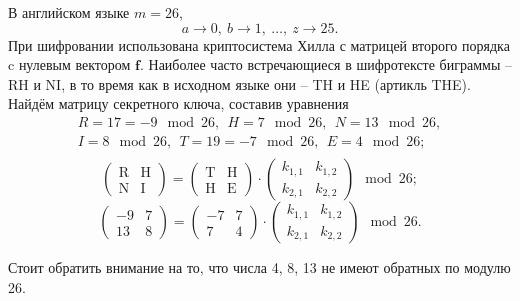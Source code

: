 \example В английском языке $m = 26$,
    \[ a \rightarrow 0, ~ b \rightarrow 1, ~ \dots, ~ z \rightarrow 25. \]
При шифровании использована криптосистема Хилла с матрицей второго порядка c нулевым вектором $\mathbf{f}$. Наиболее часто встречающиеся в шифротексте биграммы -- RH и NI, в то время как в исходном языке они -- TH и HE (артикль THE). Найдём матрицу секретного ключа, составив уравнения
\[
    \begin{array}{l}
        R = 17 = -9 \mod 26, ~~ H = 7 \mod 26, ~~ N = 13 \mod 26, \\
        I = 8 \mod 26, ~~ T = 19 = -7 \mod 26, ~~ E=4 \mod 26; \\
    \end{array}
\] \[
    \left( \begin{array}{cc}
        \text{R} & \text{H} \\
        \text{N} & \text{I}
    \end{array} \right) =
    \left( \begin{array}{cc}
        \text{T} & \text{H} \\
        \text{H} & \text{E}
    \end{array} \right) \cdot
    \left( \begin{array}{cc}
        k_{1,1} & k_{1,2} \\
        k_{2,1} & k_{2,2}
    \end{array} \right) \mod 26;
\] \[
    \left( \begin{array}{cc}
        -9 & 7 \\
        13 & 8
    \end{array} \right) =
    \left( \begin{array}{cc}
        -7 & 7 \\
        7 & 4
    \end{array} \right) \cdot
    \left( \begin{array}{cc}
        k_{1,1} & k_{1,2} \\
        k_{2,1} & k_{2,2}
    \end{array} \right) \mod 26.
\]

Стоит обратить внимание на то, что числа 4, 8, 13 не имеют обратных по модулю 26.


